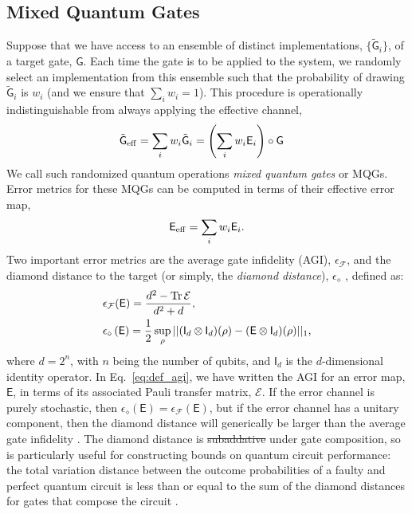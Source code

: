 \documentclass[aps,nofootinbib,pra,notitlepage,twocolumn]{revtex4-1}
\newcommand{\tr}{{\rm Tr\thinspace}}
\newcommand{\actual}{\ensuremath{\tilde{\mathsf{G}}}}
\newcommand{\target}{\ensuremath{{\mathsf{G}}}}
\newcommand{\error}{\ensuremath{{\mathsf{E}}}}
\newcommand{\errmat}{\ensuremath{{\mathcal{E}}}}
\newcommand{\AGI}{\ensuremath{\epsilon_\mathcal{F}}}
\newcommand{\dnorm}{\ensuremath{\epsilon_\diamond}}
\newcommand{\ident}{\ensuremath{\mathsf{I}}}
\newcommand{\0}{\ensuremath{\mathbf{0}}}
\newcommand{\weight}{\ensuremath{w}}
\providecommand{\DIFaddtex}[1]{{\protect\color{blue}\uwave{#1}}} %
\providecommand{\DIFdeltex}[1]{{\protect\color{red}\sout{#1}}}                      %
\providecommand{\DIFaddbegin}{} %
\providecommand{\DIFaddend}{} %
\providecommand{\DIFdelbegin}{} %
\providecommand{\DIFdelend}{} %
\providecommand{\DIFadd}[1]{\texorpdfstring{\DIFaddtex{#1}}{#1}} %
\providecommand{\DIFdel}[1]{\texorpdfstring{\DIFdeltex{#1}}{}} %
\newcommand{\DIFscaledelfig}{0.5}
\newlength{\DIFdelgraphicswidth} %
\newlength{\DIFdelgraphicsheight} %
\newcommand{\DIFaddincludegraphics}[2][]{{\color{blue}\fbox{\DIFOincludegraphics[#1]{#2}}}} %
\newcommand{\DIFdelincludegraphics}[2][]{%
\sbox{\DIFdelgraphicsbox}{\DIFOincludegraphics[#1]{#2}}%
\settoboxwidth{\DIFdelgraphicswidth}{\DIFdelgraphicsbox} %
\settoboxtotalheight{\DIFdelgraphicsheight}{\DIFdelgraphicsbox} %
\scalebox{\DIFscaledelfig}{%
\parbox[b]{\DIFdelgraphicswidth}{\usebox{\DIFdelgraphicsbox}\\[-\baselineskip] \rule{\DIFdelgraphicswidth}{0em}}\llap{\resizebox{\DIFdelgraphicswidth}{\DIFdelgraphicsheight}{%
\setlength{\unitlength}{\DIFdelgraphicswidth}%
\begin{picture}(1,1)%
\thicklines\linethickness{2pt} %
{\color[rgb]{1,0,0}\put(0,0){\framebox(1,1){}}}%
{\color[rgb]{1,0,0}\put(0,0){\line( 1,1){1}}}%
{\color[rgb]{1,0,0}\put(0,1){\line(1,-1){1}}}%
\end{picture}%
}\hspace*{3pt}}} %
} %
\DeclareRobustCommand{\DIFaddbegin}{\DIFOaddbegin \let\includegraphics\DIFaddincludegraphics} %
\DeclareRobustCommand{\DIFaddend}{\DIFOaddend \let\includegraphics\DIFOincludegraphics} %
\DeclareRobustCommand{\DIFdelbegin}{\DIFOdelbegin \let\includegraphics\DIFdelincludegraphics} %
\DeclareRobustCommand{\DIFdelend}{\DIFOaddend \let\includegraphics\DIFOincludegraphics} %
\begin{document}
\subsection{Mixed Quantum Gates}
\label{sec:mqg}
\noindent Suppose that we have access to an ensemble of distinct implementations, 
$\{\actual_i\}$, of a target gate, $\target$.
Each time the gate is to be applied to the system, we randomly select an implementation from this ensemble such that the probability of drawing $\actual_i$ is $\weight_i$ (and we ensure that $\sum_i \weight_i=1$). This procedure is operationally indistinguishable from always applying the effective channel, 
\begin{align}
	\actual_{\rm eff} &= \sum_i \weight_i \actual_i = \left(\sum_i \weight_i \error_i \right) \circ\target
\end{align}
We call such randomized quantum operations \emph{mixed quantum gates} or MQGs. Error metrics for these MQGs can be computed in terms of their effective error map, 
\begin{equation}
	\label{eq:effective_error}
	\error_{\rm eff} = \sum_i \weight_i \error_i.
\end{equation}
Two important error metrics are the average gate infidelity (AGI), $\AGI$\cite{Johnston2011}, and the diamond distance to the target (or simply, the \emph{diamond distance}), $\dnorm$ \cite{watrous2018theory}, defined as:
\begin{align}
	\label{eq:def_agi}
	&\AGI(\error) = \frac{d^2 - \tr{\errmat}}{d^2 + d},\\
	\label{eq:def_diamond}
	&\dnorm \left(\error\right)
		= \frac{1}{2} \sup_\rho \vert \vert (\ident_d\otimes \ident_d)(\rho) 
										  - (\error \otimes \ident_d)(\rho) \vert\vert_1,
\end{align}
where $d=2^n$, with $n$ being the number of qubits, and $\ident_d$ is the $d$-dimensional identity operator.  In Eq.~\eqref{eq:def_agi}, we have written the AGI for an error map, $\error$, in terms of its associated Pauli transfer matrix, $\errmat$. If the error channel is purely stochastic, then $\dnorm(\error) = \AGI(\error)$, but if the error channel has a unitary component, then the diamond distance will generically be larger than the average gate infidelity \cite{1511.00727}. The diamond distance is \DIFdelbegin \DIFdel{subaddative }\DIFdelend \DIFaddbegin \DIFadd{subadditive }\DIFaddend \cite{watrous2018theory} under gate composition, so is particularly useful for constructing bounds on quantum circuit performance: the total variation distance between the outcome probabilities of a faulty and perfect quantum circuit is less than or equal to the sum of the diamond distances for gates that compose the circuit \cite{aharonov1998quantum}.
\end{document}
